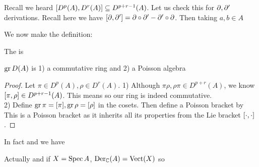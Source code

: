 \documentclass{article}
\begin{document}
Recall we heard $\comm[D^p(A)]{D^r(A)} \subseteq D^{p+r-1}(A)$. Let us check this for $\del, \del^\prime$ derivations. Recall here we have $\comm[\del]{\del^\prime} = \del \circ \del^\prime - \del^\prime \circ \del$. Then taking $a,b \in A$

We now make the definition:

\begin{definition}
The  is 
\end{definition}

\begin{prop}
$\gr D(A)$ is 1) a commutative ring and 2) a Poisson algebra
\end{prop}
\begin{proof}
Let $\pi \in D^p(A), \rho \in D^r(A)$. 
1) Although $\pi\rho, \rho\pi \in D^{p+r}(A)$, we know $\comm[\pi]{\rho} \in D^{p+r-1}(A)$. This means 
so our ring is indeed commutative. \\
2) Define $\gr\pi = [\pi], \gr\rho = [\rho]$ in the cosets. Then define a Poisson bracket by 
This is a Poisson bracket as it inherits all its properties from the Lie bracket $\comm[\cdot]{\cdot}$. 
\end{proof}
In fact 
and we have 
\begin{theorem}
Actually 
and if $X = \Spec A$, $\Der_{\mbb{C}}(A) = \Vect(X)$ so 
\end{theorem}
\end{document}
